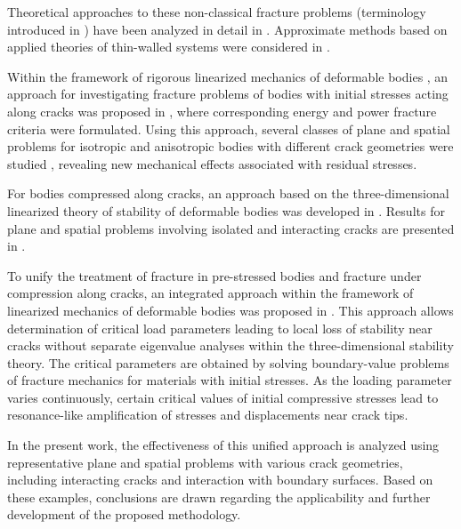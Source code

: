 Theoretical approaches to these non-classical fracture problems (terminology introduced in \cite{BogdanovGuz27,BogdanovGuz29}) have been analyzed in detail in \cite{BogdanovGuz9,BogdanovGuz30}. Approximate methods based on applied theories of thin-walled systems were considered in \cite{BogdanovGuz13,BogdanovGuz14,BogdanovGuz41,BogdanovGuz45}. 

Within the framework of rigorous linearized mechanics of deformable bodies \cite{BogdanovGuz5,BogdanovGuz28}, an approach for investigating fracture problems of bodies with initial stresses acting along cracks was proposed in \cite{BogdanovGuz25,BogdanovGuz27}, where corresponding energy and power fracture criteria were formulated. Using this approach, several classes of plane and spatial problems for isotropic and anisotropic bodies with different crack geometries were studied \cite{BogdanovGuz6,BogdanovGuz7,BogdanovGuz8,BogdanovGuz9,BogdanovGuz11,BogdanovGuz27}, revealing new mechanical effects associated with residual stresses.

For bodies compressed along cracks, an approach based on the three-dimensional linearized theory of stability of deformable bodies \cite{BogdanovGuz28} was developed in \cite{BogdanovGuz26,BogdanovGuz65,BogdanovGuz66}. Results for plane and spatial problems involving isolated and interacting cracks are presented in \cite{BogdanovGuz10,BogdanovGuz19,BogdanovGuz31,BogdanovGuz32,BogdanovGuz33,BogdanovGuz35,BogdanovGuz36,BogdanovGuz37,BogdanovGuz38,BogdanovGuz39,BogdanovGuz46,BogdanovGuz63,BogdanovGuz64}.

To unify the treatment of fracture in pre-stressed bodies and fracture under compression along cracks, an integrated approach within the framework of linearized mechanics of deformable bodies was proposed in \cite{BogdanovGuz34}. This approach allows determination of critical load parameters leading to local loss of stability near cracks without separate eigenvalue analyses within the three-dimensional stability theory. The critical parameters are obtained by solving boundary-value problems of fracture mechanics for materials with initial stresses. As the loading parameter varies continuously, certain critical values of initial compressive stresses lead to resonance-like amplification of stresses and displacements near crack tips.

In the present work, the effectiveness of this unified approach is analyzed using representative plane and spatial problems with various crack geometries, including interacting cracks and interaction with boundary surfaces. Based on these examples, conclusions are drawn regarding the applicability and further development of the proposed methodology.

